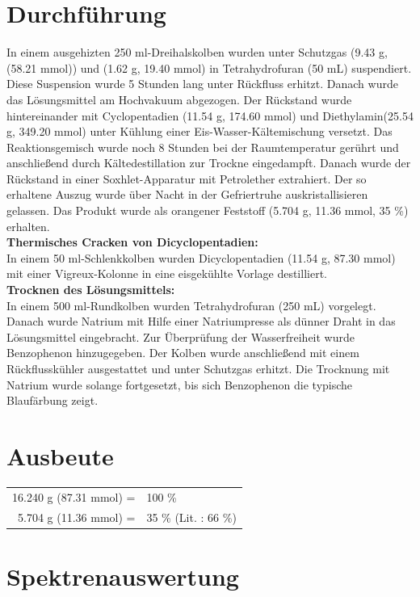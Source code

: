 \documentclass[12pt]{article}
\begin{document}
\begin{onehalfspace}
\normalsize \section{Durchführung \cite{bio}}
In einem ausgehizten 250 ml-Dreihalskolben wurden unter Schutzgas  (9.43 \si{\gram}, (58.21 \si{\milli\mol})) und  (1.62 \si{\gram}, 19.40 \si{\milli\mol}) in Tetrahydrofuran (50 \si{\milli\liter}) suspendiert. Diese Suspension wurde 5 Stunden lang unter Rückfluss erhitzt. Danach wurde das Lösungsmittel am Hochvakuum abgezogen. Der Rückstand wurde hintereinander mit Cyclopentadien (11.54 \si{\gram}, 174.60 \si{\milli\mol}) und Diethylamin(25.54 \si{\gram}, 349.20 \si{\milli\mol}) unter Kühlung einer Eis-Wasser-Kältemischung versetzt. Das Reaktionsgemisch wurde noch 8 Stunden bei der Raumtemperatur gerührt und anschließend durch Kältedestillation zur Trockne eingedampft. Danach wurde der Rückstand in einer Soxhlet-Apparatur mit Petrolether extrahiert. Der so erhaltene Auszug wurde über Nacht in der Gefriertruhe auskristallisieren gelassen. Das Produkt wurde als orangener Feststoff (5.704 \si{\gram}, 11.36 \si{\milli\mol}, 35 \%) erhalten.\\
\noindent
\textbf{Thermisches Cracken von Dicyclopentadien:}\\
In einem 50 ml-Schlenkkolben wurden Dicyclopentadien (11.54 \si{\gram}, 87.30 \si{\milli\mol}) mit einer Vigreux-Kolonne in eine eisgekühlte Vorlage destilliert. \\
\noindent
\textbf{Trocknen des Lösungsmittels:}\\
\noindent
In einem 500 ml-Rundkolben wurden Tetrahydrofuran (250 \si{\milli\liter}) vorgelegt.
Danach wurde Natrium mit Hilfe einer Natriumpresse als dünner Draht in das Lösungsmittel eingebracht. 
Zur Überprüfung der Wasserfreiheit wurde Benzophenon hinzugegeben. Der Kolben wurde anschließend mit einem Rückflusskühler ausgestattet und unter Schutzgas erhitzt. Die Trocknung mit Natrium wurde solange fortgesetzt, bis sich Benzophenon die typische Blaufärbung zeigt.
\section{Ausbeute}
\begin{tabular}{ rl}
  16.240 g (87.31 \si{\milli\mol}) =  & 100 \%\\
  5.704 g (11.36 \si{\milli\mol}) =  & 35 \% (Lit.\cite{bio} : 66 \%) \\
 \end{tabular}
\section{Spektrenauswertung}


\end{onehalfspace}
\end{document}
